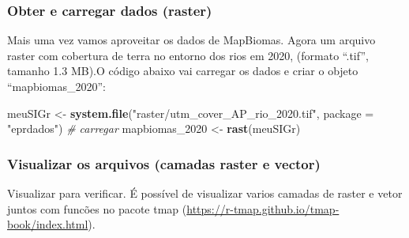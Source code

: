 \documentclass[
]{article}
\newenvironment{Shaded}{\begin{snugshade}}{\end{snugshade}}
\newcommand{\AttributeTok}[1]{\textcolor[rgb]{0.13,0.29,0.53}{#1}}
\newcommand{\CommentTok}[1]{\textcolor[rgb]{0.56,0.35,0.01}{\textit{#1}}}
\newcommand{\FunctionTok}[1]{\textcolor[rgb]{0.13,0.29,0.53}{\textbf{#1}}}
\newcommand{\NormalTok}[1]{#1}
\newcommand{\OtherTok}[1]{\textcolor[rgb]{0.56,0.35,0.01}{#1}}
\newcommand{\StringTok}[1]{\textcolor[rgb]{0.31,0.60,0.02}{#1}}
\begin{document}
\newpage

\hypertarget{obter-e-carregar-dados-raster}{%
\subsubsection{Obter e carregar dados (raster)}\label{obter-e-carregar-dados-raster}}

Mais uma vez vamos aproveitar os dados de MapBiomas. Agora um arquivo raster com cobertura de terra no entorno dos rios em 2020, (formato ``.tif'', tamanho 1.3 MB).O código abaixo vai carregar os dados e criar o objeto ``mapbiomas\_2020'':

\begin{Shaded}
\begin{Highlighting}[]
\NormalTok{meuSIGr }\OtherTok{\textless{}{-}} \FunctionTok{system.file}\NormalTok{(}\StringTok{"raster/utm\_cover\_AP\_rio\_2020.tif"}\NormalTok{, }
                       \AttributeTok{package =} \StringTok{"eprdados"}\NormalTok{)}
\CommentTok{\# carregar}
\NormalTok{mapbiomas\_2020 }\OtherTok{\textless{}{-}} \FunctionTok{rast}\NormalTok{(meuSIGr)}
\end{Highlighting}
\end{Shaded}

\hypertarget{visualizar-os-arquivos-camadas-raster-e-vector}{%
\subsubsection{Visualizar os arquivos (camadas raster e vector)}\label{visualizar-os-arquivos-camadas-raster-e-vector}}

Visualizar para verificar. É possível de visualizar varios camadas de raster e vetor juntos com funcões no pacote tmap (\url{https://r-tmap.github.io/tmap-book/index.html}).
\end{document}
